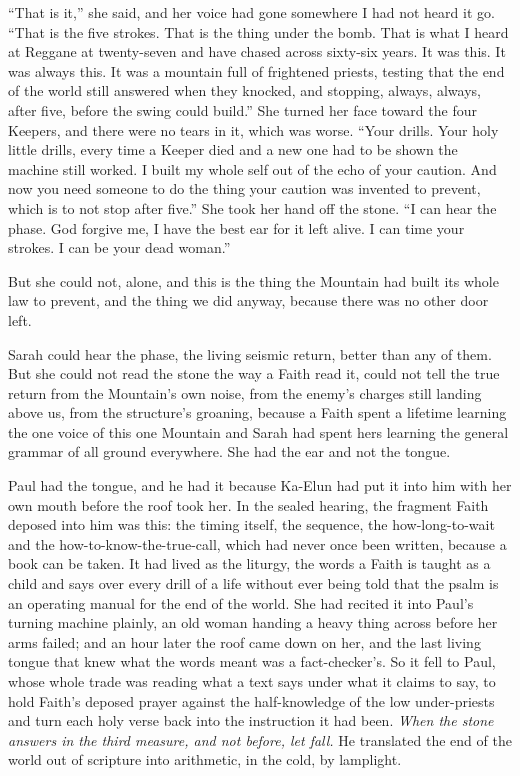 ``That is it,'' she said, and her voice had gone somewhere I had not heard it go. ``That is the five strokes. That is the thing under the bomb. That is what I heard at Reggane at twenty-seven and have chased across sixty-six years. It was this. It was always this. It was a mountain full of frightened priests, testing that the end of the world still answered when they knocked, and stopping, always, always, after five, before the swing could build.'' She turned her face toward the four Keepers, and there were no tears in it, which was worse. ``Your drills. Your holy little drills, every time a Keeper died and a new one had to be shown the machine still worked. I built my whole self out of the echo of your caution. And now you need someone to do the thing your caution was invented to prevent, which is to not stop after five.'' She took her hand off the stone. ``I can hear the phase. God forgive me, I have the best ear for it left alive. I can time your strokes. I can be your dead woman.''\par

\ornament

But she could not, alone, and this is the thing the Mountain had built its whole law to prevent, and the thing we did anyway, because there was no other door left.\par

Sarah could hear the phase, the living seismic return, better than any of them. But she could not read the stone the way a Faith read it, could not tell the true return from the Mountain's own noise, from the enemy's charges still landing above us, from the structure's groaning, because a Faith spent a lifetime learning the one voice of this one Mountain and Sarah had spent hers learning the general grammar of all ground everywhere. She had the ear and not the tongue.\par

Paul had the tongue, and he had it because Ka-Elun had put it into him with her own mouth before the roof took her. In the sealed hearing, the fragment Faith deposed into him was this: the timing itself, the sequence, the how-long-to-wait and the how-to-know-the-true-call, which had never once been written, because a book can be taken. It had lived as the liturgy, the words a Faith is taught as a child and says over every drill of a life without ever being told that the psalm is an operating manual for the end of the world. She had recited it into Paul's turning machine plainly, an old woman handing a heavy thing across before her arms failed; and an hour later the roof came down on her, and the last living tongue that knew what the words meant was a fact-checker's. So it fell to Paul, whose whole trade was reading what a text says under what it claims to say, to hold Faith's deposed prayer against the half-knowledge of the low under-priests and turn each holy verse back into the instruction it had been. \emph{When the stone answers in the third measure, and not before, let fall.} He translated the end of the world out of scripture into arithmetic, in the cold, by lamplight.\par

